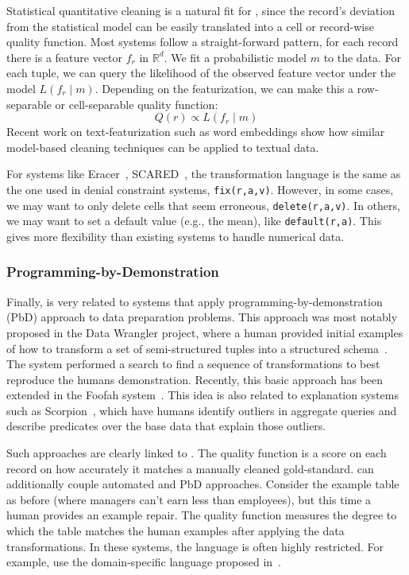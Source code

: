 Statistical quantitative cleaning is a natural fit for \sys, since the record's deviation from the statistical model can be easily translated into a cell or record-wise quality function.  
Most systems follow a straight-forward pattern, for each record there is a feature vector $f_r$ in $\mathbb{R}^d$.
We fit a probabilistic model $m$ to the data.
For each tuple, we can query the likelihood of the observed feature vector under the model $L(f_r \mid m)$.
Depending on the featurization, we can make this a row-separable or cell-separable quality function:
\[
Q(r) \propto L(f_r \mid m)
\]
Recent work on text-featurization such as word embeddings show how similar model-based cleaning techniques can be applied to textual data.  

For systems like Eracer~\cite{eracer}, SCARED~\cite{yakout2013don}, the transformation language is the same as the one used in denial constraint systems, \texttt{fix(r,a,v)}.
However, in some cases, we may want to only delete cells that seem erroneous, \texttt{delete(r,a,v)}.
In others, we may want to set a default value (e.g., the mean), like \texttt{default(r,a)}.
This gives \sys more flexibility than existing systems to handle numerical data.

  
\subsubsection{Programming-by-Demonstration}
Finally, \sys is very related to systems that apply programming-by-demonstration (PbD) approach to data preparation problems.
This approach was most notably proposed in the Data Wrangler project, where a human provided initial examples of how to transform a set of semi-structured tuples into a structured schema~\cite{wrangler,trifacta}.
The system performed a search to find a sequence of transformations to best reproduce the humans demonstration.
Recently, this basic approach has been extended in the Foofah system~\cite{jin2017foofah}.
This idea is also related to explanation systems such as Scorpion~\cite{DBLP:journals/pvldb/0002M13}, which have humans identify outliers in aggregate queries and describe predicates over the base data that explain those outliers.

Such approaches are clearly linked to \sys. The quality function is a score on each record on how accurately it matches a manually cleaned gold-standard. \sys can additionally couple automated and PbD approaches. 
Consider the example table as before (where managers can't earn less than employees), but this time  a human provides an example repair.
The quality function measures the degree to which the table matches the human examples after applying the data transformations.
In these systems, the language is often highly restricted.
For example, \cite{wrangler, jin2017foofah} use the domain-specific language proposed in~\cite{raman2001potter}.

